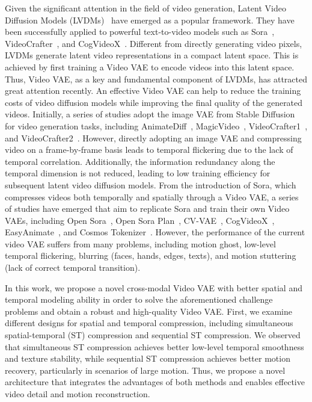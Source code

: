 Given the significant attention in the field of video generation, Latent Video Diffusion Models (LVDMs)~\cite{blattmann2023stable, blattmann2023align, he-lvdm, zhou2022magicvideo, he-videocrafter1} have emerged as a popular framework. They have been successfully applied to powerful text-to-video models such as Sora~\cite{videoworldsimulators2024}, VideoCrafter~\cite{he-videocrafter1, chen2024videocrafter2overcomingdatalimitations}, and CogVideoX~\cite{yang2024cogvideox}.
Different from directly generating video pixels, LVDMs generate latent video representations in a compact latent space. This is achieved by first training a Video VAE to encode videos into this latent space.
%
Thus, Video VAE, as a key and fundamental component of LVDMs, has attracted great attention recently.
%
An effective Video VAE can help to reduce the training costs of video diffusion models while improving the final quality of the generated videos.
%
Initially, a series of studies adopt the image VAE from Stable Diffusion~\cite{rombach2022high} for video generation tasks, including AnimateDiff~\cite{guoanimatediff}, MagicVideo~\cite{zhou2022magicvideo}, VideoCrafter1~\cite{he-videocrafter1}, and VideoCrafter2~\cite{chen2024videocrafter2overcomingdatalimitations}. 
%
However, directly adopting an image VAE and compressing video on a frame-by-frame basis leads to temporal flickering due to the lack of temporal correlation. Additionally, the information redundancy along the temporal dimension is not reduced, leading to low training efficiency for subsequent latent video diffusion models.
%
From the introduction of Sora, which compresses videos both temporally and spatially through a Video VAE, a series of studies have emerged that aim to replicate Sora and train their own Video VAEs, including Open Sora~\cite{opensora}, Open Sora Plan~\cite{pku_yuan_lab_and_tuzhan_ai_etc_2024_10948109}, CV-VAE~\cite{zhao2024cv}, CogVideoX~\cite{yang2024cogvideox}, EasyAnimate~\cite{xu2024easyanimatehighperformancelongvideo}, and Cosmos Tokenizer~\cite{cosmos_token}.
%
However, the performance of the current video VAE suffers from many problems, including motion ghost, low-level temporal flickering, blurring (faces, hands, edges, texts), and motion stuttering (lack of correct temporal transition).


In this work, we propose a novel cross-modal Video VAE with better spatial and temporal modeling ability in order to solve the aforementioned challenge problems and obtain a robust and high-quality Video VAE.
%
First, we examine different designs for spatial and temporal compression, including simultaneous spatial-temporal (ST) compression and sequential ST compression. 
%
We observed that simultaneous ST compression achieves better low-level temporal smoothness and texture stability, while sequential ST compression achieves better motion recovery, particularly in scenarios of large motion.
%
Thus, we propose a novel architecture that integrates the advantages of both methods and enables effective video detail and motion reconstruction.

